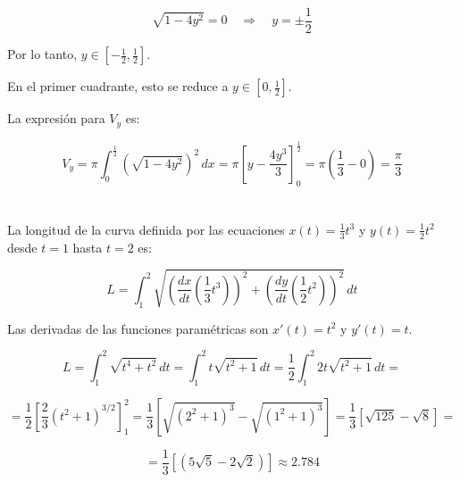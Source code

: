 \documentclass{article}
\begin{document}
	\[
	\sqrt{1 - 4y^2} = 0 \quad \Rightarrow \quad y = \pm \frac{1}{2}
	\]
	
	Por lo tanto, \(y \in \left[-\frac{1}{2}, \frac{1}{2}\right]\). 
	
	\vspace{12pt}
	
	En el primer cuadrante, esto se reduce a \(y \in \left[0, \frac{1}{2}\right]\).
	
	La expresión para \(V_y\) es:
	
	\[
	V_y = \pi \int_{0}^{\frac{1}{2}} \left(\sqrt{1 - 4y^2}\right)^2 \,dx = \pi \left[y - \frac{4y^3}{3}\right]_{0}^{\frac{1}{2}} = \pi \left(\frac{1}{3} - 0\right) = \boxed{\frac{\pi}{3}}
	\]
	

	
	\section*{}
	{\Large {}}
	
	\vspace{12pt}
	
	La longitud de la curva definida por las ecuaciones $x(t) = \frac{1}{3}t^3$ y $y(t) = \frac{1}{2}t^2$ desde $t = 1$ hasta $t = 2$ es:
	
	\[ L = \int_{1}^{2} \sqrt{\left(\frac{dx}{dt}\left(\frac{1}{3}t^3\right)\right)^2 + \left(\frac{dy}{dt}\left(\frac{1}{2}t^2\right)\right)^2} \, dt \]
	
	\vspace{12pt}
	
	Las derivadas de las funciones paramétricas son $x'(t) = t^2$ y $y'(t) = t$.
	
	\vspace{12pt}
	
	\[ L = \int_{1}^{2} \sqrt{t^4 + t^2} \, dt = \int_{1}^{2} t \sqrt{t^2 + 1} \, dt = \frac{1}{2} \int_{1}^{2} 2t\sqrt{t^2 + 1} \, dt = \]
	
	\vspace{12pt}
	
	\[ = \frac{1}{2} \left[ \frac{2}{3} (t^2 + 1)^{3/2} \right]_{1}^{2} = \frac{1}{3} \left[ \sqrt{(2^2 + 1)^3} - \sqrt{(1^2 + 1)^3} \right] = \frac{1}{3} \left[ \sqrt{125} - \sqrt{8} \right] = \]
	
	\vspace{12pt}
	
	\[ = \frac{1}{3} \left[ (5 \sqrt{5} - 2 \sqrt{2}) \right] \approx \boxed{2.784} \]
	

	
\end{document}
